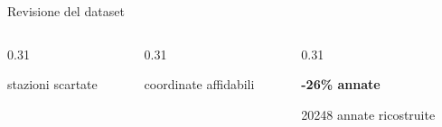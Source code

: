 \begin{frame}{Revisione del dataset}
    \vspace{0.5cm} 
    \begin{columns}[T, onlytextwidth]
      \begin{column}{0.31\textwidth}
        \centering
        {\large\bfseries{}\par}
        {\footnotesize stazioni scartate \par}
      \end{column}
      \begin{column}{0.31\textwidth}
        \centering
        {\large\bfseries{}\par}
        {\footnotesize coordinate affidabili \par}
      \end{column}
      \begin{column}{0.31\textwidth}
        \centering
        {\large\bfseries -26\% annate\par}
        {\footnotesize 20248 annate ricostruite \par}
      \end{column}
    \end{columns}
  \end{frame}


